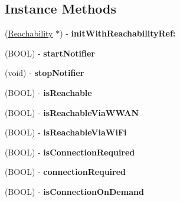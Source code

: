 \subsection*{Instance Methods}
\begin{DoxyCompactItemize}
\item 
\mbox{\label{interface_reachability_af8dbb23cc7f9ac59b0269dfaf83979fc}} 
(\mbox{\hyperlink{interface_reachability}{Reachability}} $\ast$) -\/ {\bfseries init\+With\+Reachability\+Ref\+:}
\item 
\mbox{\label{interface_reachability_ae20732960a222681fcc7caeb191158bc}} 
(B\+O\+OL) -\/ {\bfseries start\+Notifier}
\item 
\mbox{\label{interface_reachability_ab7907e9c8de0e4e15774e82c089e0b39}} 
(void) -\/ {\bfseries stop\+Notifier}
\item 
\mbox{\label{interface_reachability_ae0b18fcacc97f538502cf671aa583dbd}} 
(B\+O\+OL) -\/ {\bfseries is\+Reachable}
\item 
\mbox{\label{interface_reachability_a20011128b407d36659bc78a64cd583f5}} 
(B\+O\+OL) -\/ {\bfseries is\+Reachable\+Via\+W\+W\+AN}
\item 
\mbox{\label{interface_reachability_a994f39db8e47480480ffd7ee81159ecb}} 
(B\+O\+OL) -\/ {\bfseries is\+Reachable\+Via\+Wi\+Fi}
\item 
\mbox{\label{interface_reachability_a294f9407cd32a05f26a480871df70901}} 
(B\+O\+OL) -\/ {\bfseries is\+Connection\+Required}
\item 
\mbox{\label{interface_reachability_a731496d70dd8bfbd1b364df13cac2b4c}} 
(B\+O\+OL) -\/ {\bfseries connection\+Required}
\item 
\mbox{\label{interface_reachability_af5bea7c2cfd6439a4ff5f0ab0b92e37b}} 
(B\+O\+OL) -\/ {\bfseries is\+Connection\+On\+Demand}
\item 
\mbox{\label{interface_reachability_ad44af2ebf5ffd986dacad06e63362550}} 

\end{DoxyCompactItemize}
